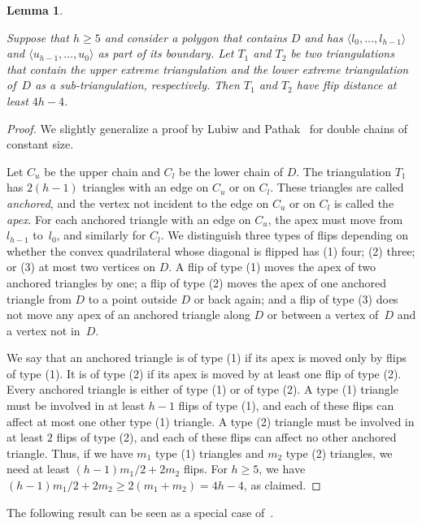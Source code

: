 \documentclass[a4paper,11pt]{article}
\newtheorem{lemma}[theorem]{Lemma}
\newcommand{\qedopt}{}
\begin{document}
\begin{lemma}\label{lem_lower_bound}
\begin{sloppypar}
Suppose that $h \geq 5$ and
consider a polygon that contains $D$ and has $\langle l_0, \dots, l_{h-1} \rangle$ and $\langle u_{h-1},\dots, u_0\rangle$ as part of 
its boundary.
Let $T_1$ and $T_2$ be two triangulations that contain the upper
extreme triangulation and the lower extreme triangulation of~$D$ as a
sub-triangulation, respectively.  Then $T_1$ and $T_2$ have flip distance at
least $4h-4$.
\end{sloppypar}
\end{lemma}
\begin{proof}
We slightly generalize a proof by Lubiw and Pathak~\cite{lubiw} for
double chains of constant size.

Let $C_u$ be the upper chain and $C_l$ be the lower
chain of $D$.
The triangulation $T_1$ has $2(h-1)$ triangles
with an edge on $C_u$ or on $C_l$.
These triangles are called \emph{anchored},
and the vertex not incident to the edge on $C_u$ or on $C_l$ 
is called the \emph{apex}.
For each anchored triangle with an edge on $C_u$,
the apex must move from $l_{h-1}$ to~$l_0$, and similarly for $C_l$.
We distinguish three
types of flips depending on whether the convex quadrilateral whose diagonal
is flipped has (1) four; (2) three; or
(3) at most two vertices on $D$.
A flip of type (1) moves the apex
of two anchored triangles by one; a flip of type (2) moves the apex of one 
anchored triangle from
$D$ to a point outside $D$ or back again; and a flip of type (3)
does not move any apex of an anchored triangle along $D$ or between a vertex 
of~$D$ and a vertex not in~$D$.

We say that an anchored triangle is of type (1) if its apex is moved
only by flips of type (1). It is of type (2) if its apex
is moved by at least one flip of type (2). Every anchored triangle
is either of type (1) or of type (2).
A type (1) triangle must be involved
in at least $h-1$ flips of type (1), and each of these flips
can affect at most one other type (1) triangle.
A type (2) triangle must be involved in at least $2$
flips of type (2), and each of these flips can affect
no other anchored triangle.
Thus, if we have $m_1$ type (1) triangles and $m_2$ type (2)
triangles, we need at least
$(h-1)m_1/2 + 2m_2$ flips.
For $h \geq 5$, we have
$(h-1)m_1/2 + 2m_2 \geq 2(m_1 + m_2) = 4h -4$,
as claimed.
\qedopt
\end{proof}

The following result can be seen as a special case of~\cite[Proposition~1]{point_set_hard}.
\end{document}

